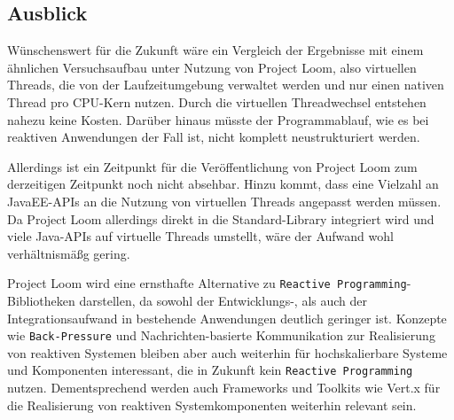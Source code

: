 \subsection{Ausblick}
\label{subsec:ausblick}
Wünschenswert für die Zukunft wäre ein Vergleich der Ergebnisse mit einem ähnlichen Versuchsaufbau unter Nutzung von Project Loom,
also virtuellen Threads, die von der Laufzeitumgebung verwaltet werden und nur einen nativen Thread pro CPU-Kern nutzen.
Durch die virtuellen Threadwechsel entstehen nahezu keine Kosten. Darüber hinaus müsste der Programmablauf, wie es bei reaktiven Anwendungen
der Fall ist, nicht komplett neustrukturiert werden.

Allerdings ist ein Zeitpunkt für die Veröffentlichung von Project Loom zum derzeitigen Zeitpunkt noch nicht absehbar.
Hinzu kommt, dass eine Vielzahl an JavaEE-APIs an die Nutzung von virtuellen Threads angepasst werden müssen.
Da Project Loom allerdings direkt in die Standard-Library
integriert wird und viele Java-APIs auf virtuelle Threads umstellt, wäre der Aufwand wohl verhältnismäßg gering.

Project Loom wird eine ernsthafte Alternative zu \verb|Reactive Programming|-Bibliotheken darstellen, da sowohl der Entwicklungs-, als auch
der Integrationsaufwand in bestehende Anwendungen deutlich geringer ist.
Konzepte wie \verb|Back-Pressure| und Nachrichten-basierte Kommunikation zur Realisierung von reaktiven Systemen
bleiben aber auch weiterhin für hochskalierbare Systeme und Komponenten interessant, die in Zukunft kein \verb|Reactive Programming| nutzen.
Dementsprechend werden auch Frameworks und Toolkits wie Vert.x für die Realisierung von reaktiven Systemkomponenten weiterhin
relevant sein.